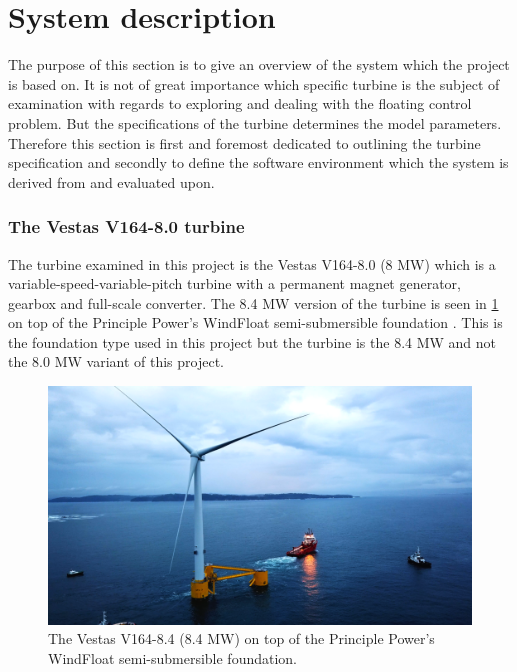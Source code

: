 \section{System description} \label{sec:sys-descr}
The purpose of this section is to give an overview of the system which the project is based on. It is not of great importance which specific turbine is the subject of examination with regards to exploring and dealing with the floating control problem. But the specifications of the turbine determines the model parameters. Therefore this section is first and foremost dedicated to outlining the turbine specification and secondly to define the software environment which the system is derived from and evaluated upon. 

\subsubsection{The Vestas V164-8.0 turbine}
The turbine examined in this project is the Vestas V164-8.0 (8 MW) which is a variable-speed-variable-pitch turbine with a permanent magnet generator, gearbox and full-scale converter. The 8.4 MW version of the turbine is seen in \cref{fig:v164_8.4mw} on top of the Principle Power’s WindFloat semi-submersible foundation \cite{WindFloatAtlantic}. This is the foundation type used in this project but the turbine is the 8.4 MW and not the 8.0 MW variant of this project.


\begin{figure}[ht]
	\centering
	\includegraphics[width=0.80\linewidth]{Graphics/v164-8_4mw_floating.png}
	\caption{The Vestas V164-8.4 (8.4 MW) on top of the Principle Power’s WindFloat semi-submersible foundation.}
	\label{fig:v164_8.4mw}
\end{figure}

